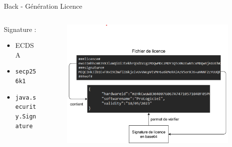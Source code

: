 \documentclass{cubeamer}
\begin{document}
\begin{frame}{Back - Génération Licence}
    \begin{columns}
    \begin{column}{0.4\textwidth}
        Signature :
        \begin{itemize}
            \item ECDSA
            \item \verb:secp256k1:
            \item \verb:java.security.Signature:
        \end{itemize}
    \end{column}
    \begin{column}{0.6\textwidth}  
        \vspace{-1cm} 
        \begin{figure}
            \includegraphics[scale=0.5]{img/licence.png}
        \end{figure}
    \end{column}
    \end{columns}
\end{frame}
\end{document}
